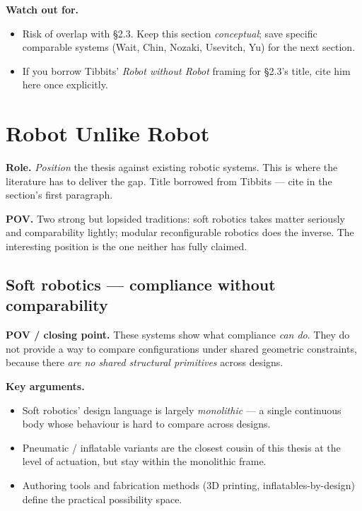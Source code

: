 \textbf{Watch out for.}
\begin{itemize}
    \item Risk of overlap with \S2.3. Keep this section
          \emph{conceptual}; save specific comparable systems
          (Wait, Chin, Nozaki, Usevitch, Yu) for the next section.
    \item If you borrow Tibbits' \emph{Robot without Robot} framing
          for \S2.3's title, cite him here once explicitly.
\end{itemize}

\section{Robot Unlike Robot}
\label{sec:robot-unlike-robot}

\textbf{Role.} \emph{Position} the thesis against existing robotic
systems. This is where the literature has to deliver the gap.
Title borrowed from Tibbits --- cite \cite{tibbitsThingsFallTogether2021}
in the section's first paragraph.

\textbf{POV.} Two strong but lopsided traditions: soft robotics
takes matter seriously and comparability lightly; modular
reconfigurable robotics does the inverse. The interesting
position is the one neither has fully claimed.

\subsection{Soft robotics --- compliance without comparability}
\label{subsec:soft-robotics}

\textbf{POV / closing point.} These systems show what compliance
\emph{can do}. They do not provide a way to compare configurations
under shared geometric constraints, because there \emph{are no
shared structural primitives} across designs.

\textbf{Key arguments.}
\begin{itemize}
    \item Soft robotics' design language is largely \emph{monolithic} ---
          a single continuous body whose behaviour is hard to compare
          across designs.
    \item Pneumatic / inflatable variants are the closest cousin of
          this thesis at the level of actuation, but stay within the
          monolithic frame.
    \item Authoring tools and fabrication methods (3D printing,
          inflatables-by-design) define the practical possibility
          space.
\end{itemize}

